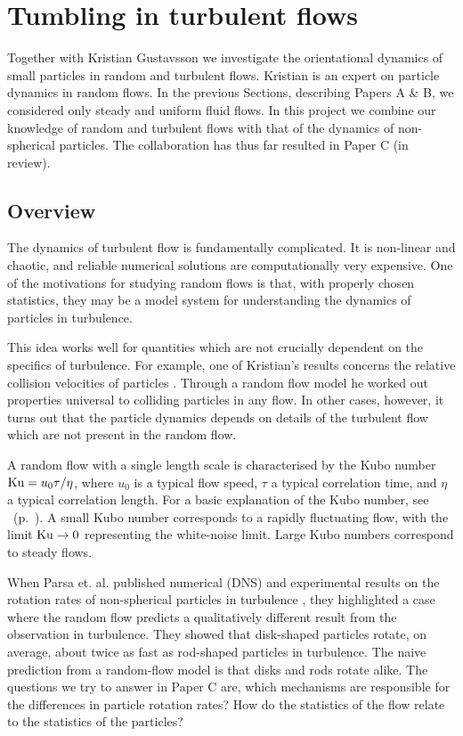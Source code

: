 \documentclass[thesis.tex]{subfiles}
\begin{document}
\chapter{Tumbling in turbulent flows}

Together with Kristian Gustavsson we investigate the orientational dynamics of small particles in random and turbulent flows. 
Kristian is an expert on particle dynamics in random flows. In the previous Sections, describing Papers A \& B, we considered only steady and uniform fluid flows. In this project we combine our knowledge of random and turbulent flows with that of the dynamics of non-spherical particles. The collaboration has thus far resulted in Paper C (in review).

\section{Overview}

The dynamics of turbulent flow is fundamentally complicated. It is non-linear and chaotic, and reliable numerical solutions are computationally very expensive. One of the motivations for studying random flows is that, with properly chosen statistics, they may be a model system for understanding the dynamics of particles in turbulence.

This idea works well for quantities which are not crucially dependent on the specifics of turbulence. For example, one of Kristian's results concerns the relative collision velocities of particles \cite{gustavsson2011}. Through a random flow model he worked out properties universal to colliding particles in any flow. In other cases, however, it turns out that the particle dynamics depends on details of the turbulent flow which are not present in the random flow. 

A random flow with a single length scale is characterised by the Kubo number $\mbox{Ku} = u_0 \tau/\eta$, where $u_0$ is a typical flow speed, $\tau$ a typical correlation time, and $\eta$ a typical correlation length. For a basic explanation of the Kubo number, see ~(p.~\pageref{sec:context}). A small Kubo number corresponds to a rapidly fluctuating flow, with the limit $\mbox{Ku}\to0$ representing the white-noise limit. Large Kubo numbers correspond to steady flows.

When Parsa et. al. published numerical (DNS) and experimental results on the rotation rates of non-spherical particles in turbulence \cite{parsa2012}, they highlighted a case where the random flow predicts a qualitatively different result from the observation in turbulence. They showed that disk-shaped particles rotate, on average, about twice as fast as rod-shaped particles in turbulence. The naive prediction from a random-flow model is that disks and rods rotate alike. The questions we try to answer in Paper C are, which mechanisms are responsible for the differences in particle rotation rates? How do the statistics of the flow relate to the statistics of the particles? 
\end{document}
